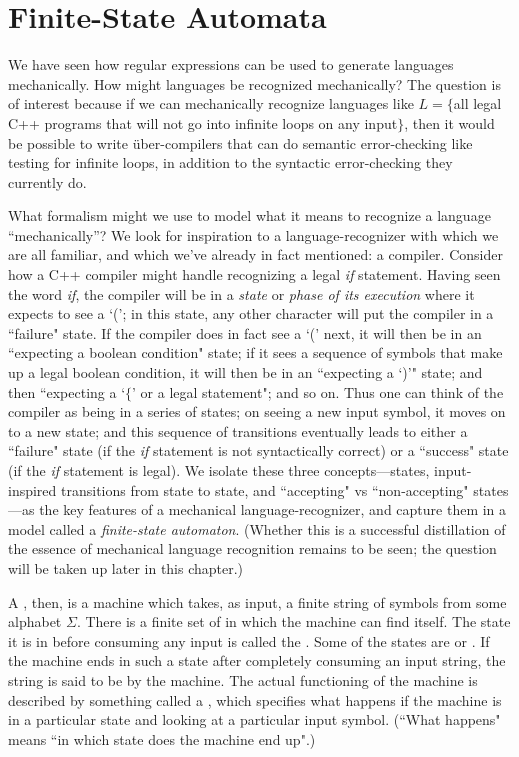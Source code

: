 \section{Finite-State Automata}\label{S-fsa-1}

We have seen how regular expressions can be used to generate languages
mechanically. How might languages be recognized mechanically? 
The question is of interest because if we can mechanically recognize languages
like $L= \{$all legal C++ programs that will not go into infinite loops on any
input$\}$, then it would be possible to write \"uber-compilers that can do
semantic error-checking like testing for infinite loops, in addition to the
syntactic error-checking they currently do.

What formalism might we use to model what it means to recognize a language
``mechanically''?  We look for inspiration to a language-recognizer with which
we are all familiar, and which we've already in fact mentioned: a compiler.
Consider how a C++ compiler might handle recognizing a legal {\em if}
statement.  Having seen the word {\em if}, the compiler will be in a {\em state}
or {\em phase of its execution} where it expects to see a `('; in this state,
any other character will put the compiler in a ``failure" state.  If the compiler
does in fact see a `(' next, it will then be in an ``expecting a boolean
condition" state; if it sees a sequence of symbols that make up a legal boolean
condition, it will then be in an ``expecting a `)'" state; and then ``expecting
a `$\{$' or a legal statement"; and so on.  Thus one can think of the compiler as
being in a series of states; on seeing a new input symbol, it moves on to a new
state; and this sequence of transitions eventually leads to either a ``failure"
state (if the {\em if} statement is not syntactically correct) or a ``success"
state (if the {\em if} statement is legal).  We isolate these three
concepts---states, input-inspired transitions from state to state, and
``accepting" vs ``non-accepting" states---as the key features of a mechanical
language-recognizer, and capture them in a model called a {\em finite-state
automaton}.  (Whether this is a successful distillation of the essence of
mechanical language recognition remains to be seen; the question will be taken
up later in this chapter.)

A , then, is a machine which takes, as input, 
a finite
string of symbols from some alphabet $\Sigma$.
There is a finite set of  in which the machine can find itself.  The
state it is in before consuming any input is called the .
Some of the states are 
or .  If the machine ends in such a state after completely consuming
an input string, the string is said to be  by the machine.
The actual functioning of the machine is described by something called a 
, which specifies 
what happens if the machine is in a particular state and looking at a
particular input symbol.  (``What happens" means ``in which state does the
machine end up".)    

